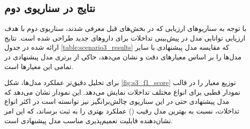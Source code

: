 \subsection{نتایج در سناریوی دوم}

با توجه به سناریوهای ارزیابی که در بخش‌های قبل‌ معرفی شدند، سناریوی دوم با هدف ارزیابی توانایی مدل در پیش‌بینی تداخلات برای داروهای جدید طراحی شده است. نتایج ارائه شده در جدول \ref{table:scenario3_results} که مقایسه مدل پیشنهادی با سایر مدل‌ها را بر اساس معیارهای دقت و  نشان می‌دهد، حاکی از برتری مدل پیشنهادی در تمامی این معیارها است.

\begin{table}[t]
	\caption{مقایسه نتایج مدل پیشنهادی با سایر مدل‌ها در سناریوی دوم}
	\label{table:scenario3_results}
	\centering %
	\renewcommand{\arraystretch}{2.5} 
\end{table}

برای تحلیل دقیق‌تر عملکرد مدل‌ها، شکل \ref{fig:s3_f1_score} توزیع معیار  را در قالب نمودار قطبی برای انواع مختلف تداخلات نمایش می‌دهد. این نمودار نشان می‌دهد که مدل پیشنهادی حتی در این سناریوی چالش‌برانگیز نیز توانسته است در اکثر انواع تداخلات، نسبت به بهترین مدل رقیب () عملکرد بهتری را به ثبت برساند، که این امر نشان‌دهنده قابلیت تعمیم‌پذیری مناسب مدل پیشنهادی است.

